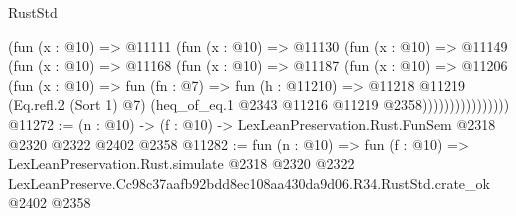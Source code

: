 \begin{lexlean}{RustStd}
\begin{coremodule}
                    (fun (x : @10) =>
                    @11111
                      (fun (x : @10) =>
                      @11130
                        (fun (x : @10) =>
                        @11149
                          (fun (x : @10) =>
                          @11168
                            (fun (x : @10) =>
                            @11187
                              (fun (x : @10) =>
                              @11206
                                (fun (x : @10) =>
                                fun (fn : @7) =>
                                fun (h : @11210) =>
                                @11218
                                  @11219
                                  (Eq.refl.{2} (Sort 1) @7)
                                  (heq_of_eq.{1} @2343 @11216 @11219 @2358))))))))))))))))
@11272 := (n : @10) -> (f : @10) -> LexLeanPreservation.Rust.FunSem @2318 @2320 @2322 @2402 @2358
@11282 := fun (n : @10) =>
  fun (f : @10) =>
  LexLeanPreservation.Rust.simulate
    @2318
    @2320
    @2322
    LexLeanPreserve.Cc98c37aafb92bdd8ec108aa430da9d06.R34.RustStd.crate_ok
    @2402
    @2358
\end{coremodule}
\end{lexlean}
